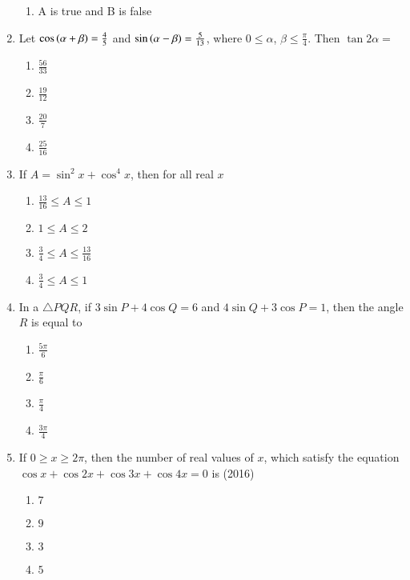 \begin{enumerate}[label=\thesubsection.\arabic*,ref=\thesubsection.\theenumi]
\begin{multicols}{2}
\begin{enumerate}
\item {A} is true and {B} is false
\end{enumerate}
\end{multicols}
\item Let $\cos\left(\alpha+\beta\right)=\frac{4}{5}$  and $\sin\left(\alpha-\beta\right)=\frac{5}{13}$, where $0\le\alpha$, $\beta\le\frac{\pi}{4}$. Then $\tan2\alpha=$ \hfill{}
\begin{multicols}{4}
\begin{enumerate}
\item $\frac{56}{33}$
\columnbreak
\item $\frac{19}{12}$
\columnbreak
\item $\frac{20}{7}$
\columnbreak
\item $\frac{25}{16}$
\end{enumerate} 
\end{multicols}
\item If $A=\sin^2x +\cos^4 x$, then for all real $x$
\hfill{}
\begin{multicols}{4} 
\begin{enumerate}
\item $\frac{13}{16}\le A\le1$
\item $1\le A \le2$
\item $\frac{3}{4}\le A \le\frac{13}{16}$
\item $\frac{3}{4}\le A \le1$
\end{enumerate} 
\end{multicols}
\item In a ${\triangle PQR}$, if $3 \sin {P} + 4 \cos {Q}=6$ and $4\sin {Q}+3\cos {P}=1$, then the angle ${R}$ is equal to
\hfill{}
\begin{multicols}{4}
\begin{enumerate}
\item $\frac{5\pi}{6}$
\item $\frac{\pi}{6}$
\item $\frac{\pi}{4}$
\item $\frac{3\pi}{4}$
\end{enumerate} 
\end{multicols}
\item If $0 \ge x \ge 2\pi$, then the number of real values of $x$, which   satisfy the equation $\cos x+\cos2x+\cos3x+\cos4x=0$ is
%
\hfill {(2016)}
\begin{multicols}{4}
    \begin{enumerate}
    \item $7$
    \item $9$
    \item $3$
    \item $5$
    \end{enumerate}
\end{multicols}
    

\end{enumerate}
